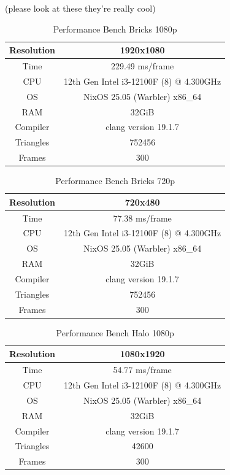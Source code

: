 \documentclass[12pt]{article}
\begin{document}
(please look at these they're really cool)


\begin{table}[H]
	\caption{Performance Bench Bricks 1080p}
	\centering
	\begin{tabular}{|c|c|}
		\hline
		Resolution& 1920x1080\\\hline
		Time& 229.49 ms/frame\\\hline
		CPU&12th Gen Intel i3-12100F (8) @ 4.300GHz\\\hline
		OS&NixOS 25.05 (Warbler) x86\_64\\\hline
		RAM&32GiB\\\hline
		Compiler&clang version 19.1.7\\\hline
		Triangles&752456\\\hline
		Frames&300\\\hline
	\end{tabular}
	\label{table:performance-1080-brick}
\end{table}

\begin{table}[H]
	\caption{Performance Bench Bricks 720p}
	\centering
	\begin{tabular}{|c|c|}
		\hline
		Resolution& 720x480\\\hline
		Time& 77.38 ms/frame\\\hline
		CPU&12th Gen Intel i3-12100F (8) @ 4.300GHz\\\hline
		OS&NixOS 25.05 (Warbler) x86\_64\\\hline
		RAM&32GiB\\\hline
		Compiler&clang version 19.1.7\\\hline
		Triangles&752456\\\hline
		Frames&300\\\hline
	\end{tabular}
	\label{table:performance-720-brick}
\end{table}

\begin{table}[H]
	\caption{Performance Bench Halo 1080p}
	\centering
	\begin{tabular}{|c|c|}
		\hline
		Resolution& 1080x1920\\\hline
		Time& 54.77 ms/frame\\\hline
		CPU&12th Gen Intel i3-12100F (8) @ 4.300GHz\\\hline
		OS&NixOS 25.05 (Warbler) x86\_64\\\hline
		RAM&32GiB\\\hline
		Compiler&clang version 19.1.7\\\hline
		Triangles&42600\\\hline
		Frames&300\\\hline
	\end{tabular}
	\label{table:performance-1080-halo}
\end{table}
\end{document}
